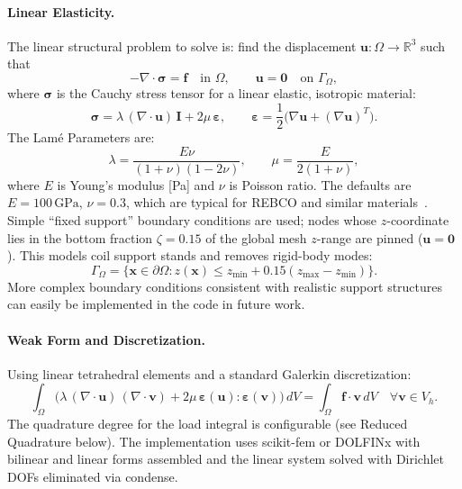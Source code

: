 \paragraph{Linear Elasticity.}
The linear structural problem to solve is: find the displacement $\mathbf{u} : \Omega \to \mathbb{R}^3$ such that
\begin{equation}
  -\nabla \cdot \boldsymbol{\sigma} = \mathbf{f}
  \quad \text{in } \Omega,
  \qquad
  \mathbf{u} = \mathbf{0}
  \quad \text{on } \Gamma_\Omega,
\end{equation}
where $\boldsymbol{\sigma}$ is the Cauchy stress tensor for a linear elastic, isotropic material:
\begin{equation}
  \boldsymbol{\sigma} = \lambda \, (\nabla \cdot \mathbf{u}) \, \mathbf{I} + 2\mu \, \boldsymbol{\varepsilon},
  \qquad
  \boldsymbol{\varepsilon} = \frac{1}{2}\bigl(\nabla \mathbf{u} + (\nabla \mathbf{u})^T\bigr).
\end{equation}
The Lam\'e Parameters are:
\begin{equation}
  \lambda = \frac{E \nu}{(1+\nu)(1-2\nu)},
  \qquad
  \mu = \frac{E}{2(1+\nu)},
\end{equation}
where $E$ is Young's modulus [Pa] and $\nu$ is Poisson ratio. The defaults are $E = 100\,\text{GPa}$, $\nu = 0.3$, which are typical for REBCO and similar materials~\cite{srivastava2024modelling}.
Simple ``fixed support'' boundary conditions are used; nodes whose $z$-coordinate lies in the bottom fraction $\zeta = 0.15$ of the global mesh $z$-range are pinned ($\mathbf{u} = \mathbf{0}$). This models coil support stands and removes rigid-body modes:
\begin{equation}
  \Gamma_\Omega = \bigl\{ \mathbf{x} \in \partial\Omega : z(\mathbf{x}) \leq z_{\min} + 0.15(z_{\max} - z_{\min}) \bigr\}.
\end{equation}
More complex boundary conditions consistent with realistic support structures can easily be implemented in the code in future work.

\paragraph{Weak Form and Discretization.}
Using linear tetrahedral elements and a standard Galerkin discretization:
\begin{equation}
  \int_\Omega \bigl( \lambda \, (\nabla \cdot \mathbf{u}) \, (\nabla \cdot \mathbf{v}) + 2\mu \, \boldsymbol{\varepsilon}(\mathbf{u}) : \boldsymbol{\varepsilon}(\mathbf{v}) \bigr) \, dV
  = \int_\Omega \mathbf{f} \cdot \mathbf{v} \, dV
  \quad \forall \mathbf{v} \in V_h.
\end{equation}
The quadrature degree for the load integral is configurable (see Reduced Quadrature below).
The implementation uses scikit-fem or DOLFINx with bilinear and linear forms assembled and the linear system solved with Dirichlet DOFs eliminated via condense.

